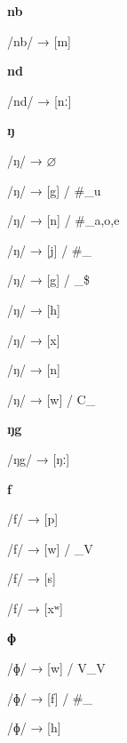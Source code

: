 \begin{center}\textbf{nb}\end{center}
\begin{multicols}{4}
\noindent /nb/ → [m]

\end{multicols}

\begin{center}\textbf{nd}\end{center}
\begin{multicols}{4}
\noindent /nd/ → [nː]

\end{multicols}

\begin{center}\textbf{ŋ}\end{center}
\begin{multicols}{4}
\noindent /ŋ/ → $\varnothing$

\noindent /ŋ/ → [g] / \#\_u

\noindent /ŋ/ → [n] / \#\_{a,o,e}

\noindent /ŋ/ → [j] / \#\_

\noindent /ŋ/ → [g] / \_\$

\noindent /ŋ/ → [h]

\noindent /ŋ/ → [x]

\noindent /ŋ/ → [n]

\noindent /ŋ/ → [w] / C\_

\end{multicols}

\begin{center}\textbf{ŋg}\end{center}
\begin{multicols}{4}
\noindent /ŋg/ → [ŋː]

\end{multicols}

\begin{center}\textbf{f}\end{center}
\begin{multicols}{4}
\noindent /f/ → [p]

\noindent /f/ → [w] / \_V

\noindent /f/ → [s]

\noindent /f/ → [xʷ]

\end{multicols}

\begin{center}\textbf{ɸ}\end{center}
\begin{multicols}{4}
\noindent /ɸ/ → [w] / V\_V

\noindent /ɸ/ → [f] / \#\_

\noindent /ɸ/ → [h]

\end{multicols}

